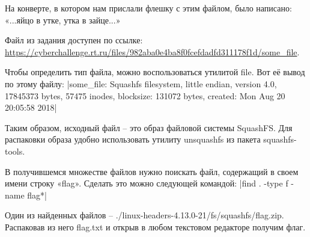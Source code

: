 
На конверте, в котором нам прислали флешку с этим файлом, было написано: «...яйцо в утке, утка в зайце...»

Файл из задания доступен по ссылке: \url{https://cyberchallenge.rt.ru/files/982aba0e4ba8f0fcefdadfd311178f1d/some_file}.

\solutionSection

Чтобы определить тип файла, можно воспользоваться утилитой file. Вот её вывод по этому файлу:
|some_file: Squashfs filesystem, little endian, version 4.0, 17845373 bytes, 57475 inodes, blocksize: 131072 bytes, created: Mon Aug 20 20:05:58 2018|

Таким образом, исходный файл – это образ файловой системы SquashFS. Для распаковки образа удобно использовать утилиту unsquashfs из пакета squashfs-tools.

В получившемся множестве файлов нужно поискать файл, содержащий в своем имени строку «flag». Сделать это можно следующей командой:
|find . -type f -name flag*|

Один из найденных файлов –  ./linux-headers-4.13.0-21/fs/squashfs/flag.zip. Распаковав из него flag.txt и открыв в любом текстовом редакторе получим флаг.

